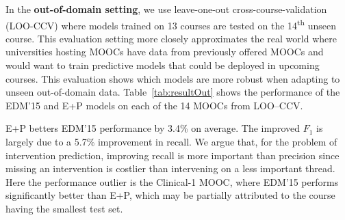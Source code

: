 \documentclass[letterpaper]{article}
\begin{document}
In the \textbf{out-of-domain setting}, we use leave-one-out 
cross-course-validation (LOO-CCV) where models trained 
on 13 courses are tested on the 14\textsuperscript{th} unseen course. 
This evaluation setting more closely approximates the real world 
where universities hosting MOOCs have data from previously offered MOOCs and 
would want to train predictive models that could be deployed in upcoming 
courses. This evaluation shows which models are more robust when adapting 
to unseen out-of-domain data. Table~\ref{tab:resultOut} shows the 
performance of the EDM'15 and E+P models on each of the 14 MOOCs 
from LOO--CCV.

E+P betters EDM'15 performance by 3.4\% on average. The improved $F_1$ 
is largely due to a 5.7\% improvement in recall. We argue that, for the problem 
of intervention prediction, improving recall is more important than precision 
since missing an intervention is costlier than intervening on a less 
important thread. Here the performance outlier is the {\sc Clinical-1} MOOC, 
where EDM'15 performs significantly better than E+P, which may be partially 
attributed to the course having the smallest test set.
\end{document}

